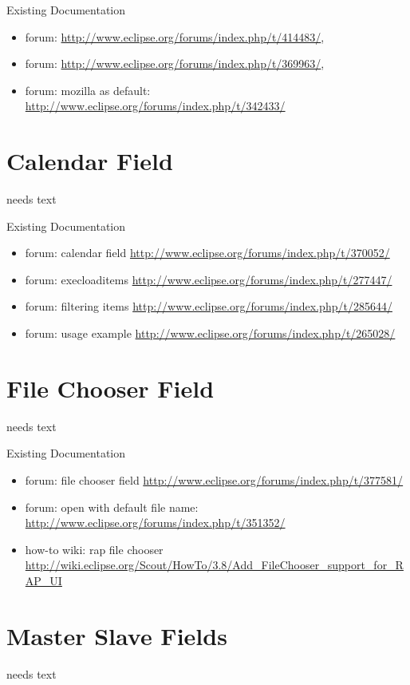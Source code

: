 \documentclass[a4paper,10pt,twoside]{book}
\begin{document}
\noindent Existing Documentation
\begin{itemize}
  \item forum: \url{http://www.eclipse.org/forums/index.php/t/414483/}, 
  \item forum: \url{http://www.eclipse.org/forums/index.php/t/369963/}, 
  \item forum: mozilla as default: \url{http://www.eclipse.org/forums/index.php/t/342433/}
\end{itemize}

\section{Calendar Field}
needs text

\noindent Existing Documentation
\begin{itemize}
  \item forum: calendar field \url{http://www.eclipse.org/forums/index.php/t/370052/}
  \item forum: execloaditems \url{http://www.eclipse.org/forums/index.php/t/277447/}
  \item forum: filtering items \url{http://www.eclipse.org/forums/index.php/t/285644/}
  \item forum: usage example \url{http://www.eclipse.org/forums/index.php/t/265028/}
\end{itemize}

\section{File Chooser Field}
needs text

\noindent Existing Documentation
\begin{itemize}
  \item forum: file chooser field \url{http://www.eclipse.org/forums/index.php/t/377581/}
  \item forum: open with default file name: \url{http://www.eclipse.org/forums/index.php/t/351352/}
  \item how-to wiki: rap file chooser \url {http://wiki.eclipse.org/Scout/HowTo/3.8/Add_FileChooser_support_for_RAP_UI}
\end{itemize}

\section{Master Slave Fields}
needs text
\end{document}
